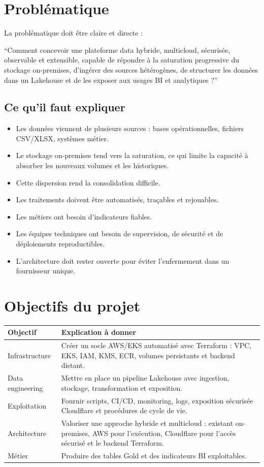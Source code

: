\documentclass[11pt,a4paper]{article}
\newcommand{\important}[1]{%
  \vspace{0.25cm}
  \noindent
  \colorbox{softblue}{%
    \parbox{\dimexpr\textwidth-2\fboxsep\relax}{#1}%
  }
  \vspace{0.2cm}
}
\begin{document}
\section{Problématique}

La problématique doit être claire et directe :

\important{
``Comment concevoir une plateforme data hybride, multicloud, sécurisée, observable et extensible, capable de répondre à la saturation progressive du stockage on-premises, d'ingérer des sources hétérogènes, de structurer les données dans un Lakehouse et de les exposer aux usages BI et analytiques ?''
}

\subsection{Ce qu'il faut expliquer}

\begin{itemize}
  \item Les données viennent de plusieurs sources : bases opérationnelles, fichiers CSV/XLSX, systèmes métier.
  \item Le stockage on-premises tend vers la saturation, ce qui limite la capacité à absorber les nouveaux volumes et les historiques.
  \item Cette dispersion rend la consolidation difficile.
  \item Les traitements doivent être automatisés, traçables et rejouables.
  \item Les métiers ont besoin d'indicateurs fiables.
  \item Les équipes techniques ont besoin de supervision, de sécurité et de déploiements reproductibles.
  \item L'architecture doit rester ouverte pour éviter l'enfermement dans un fournisseur unique.
\end{itemize}

\section{Objectifs du projet}

\begin{tabularx}{\textwidth}{@{}p{}X@{}}
\toprule
\textbf{Objectif} & \textbf{Explication à donner} \\
\midrule
Infrastructure & Créer un socle AWS/EKS automatisé avec Terraform : VPC, EKS, IAM, KMS, ECR, volumes persistants et backend distant. \\
Data engineering & Mettre en place un pipeline Lakehouse avec ingestion, stockage, transformation et exposition. \\
Exploitation & Fournir scripts, CI/CD, monitoring, logs, exposition sécurisée Cloudflare et procédures de cycle de vie. \\
Architecture & Valoriser une approche hybride et multicloud : existant on-premises, AWS pour l'exécution, Cloudflare pour l'accès sécurisé et le backend Terraform. \\
Métier & Produire des tables Gold et des indicateurs BI exploitables. \\
\bottomrule
\end{tabularx}
\end{document}
